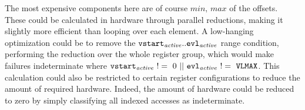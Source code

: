 The most expensive components here are of course $min,\,max$ of the offsets.
These could be calculated in hardware through parallel reductions, making it slightly more efficient than looping over each element.
A low-hanging optimization could be to remove the ${\texttt{vstart}}_{\mathit{active}}{}..{\texttt{evl}}_{\mathit{active}}{}$ range condition, performing the reduction over the whole register group, which would make failures indeterminate where $\vstartactive{}\ !=\ 0\ ||\ \evlactive{}\ !=\ \code{VLMAX}$.
This calculation could also be restricted to certain register configurations to reduce the amount of required hardware.
Indeed, the amount of hardware could be reduced to zero by simply classifying all indexed accesses as indeterminate.